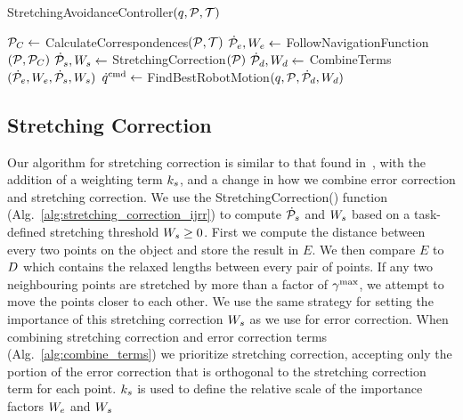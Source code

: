 \begin{algorithm}[h]
    \caption{StretchingAvoidanceController$(q, \mathcal{P}, \mathcal{T})$}
    \begin{algorithmic}[1]
        \State $\mathcal{P}_C \gets$ CalculateCorrespondences$(\mathcal{P}, \mathcal{T})$ \label{alg:calc_corr_line}
        \State $\dot{\mathcal{P}}_e, W_e \gets$ FollowNavigationFunction$(\mathcal{P}, \mathcal{P}_C)$ \label{alg:follow_nav_line}
        \State $\dot{\mathcal{P}}_s, W_s \gets$ StretchingCorrection$(\mathcal{P})$ \label{alg:stretch_corr_line}
        \State $\dot{\mathcal{P}}_d, W_d \gets$ CombineTerms$(\dot{\mathcal{P}}_e, W_e, \dot{\mathcal{P}}_s, W_s)$ \label{alg:combine_line}
        \State $\dot{q}^\textrm{cmd} \gets$ FindBestRobotMotion$(q, \mathcal{P}, \dot{\mathcal{P}}_d, W_d)$ \label{alg:find_best_line}
    \end{algorithmic}
    \label{alg:stretching_avoidance_controller}
\end{algorithm}

\subsection{Stretching Correction}
\label{sec:stretching_correction}

Our algorithm for stretching correction is similar to that found in~\cite{Berenson2013}, with the addition of a weighting term $k_s$, and a change in how we combine error correction and stretching correction. We use the StretchingCorrection() function (Alg.~\ref{alg:stretching_correction_ijrr}) to compute $\dot{\mathcal{P}}_s$ and $W_s$ based on a task-defined stretching threshold $W_s \geq 0$. First we compute the distance between every two points on the object and store the result in $E$. We then compare $E$ to $D$ which contains the relaxed lengths between every pair of points. If any two neighbouring points are stretched by more than a factor of $\gamma^{\textrm{max}}$, we attempt to move the points closer to each other. We use the same strategy for setting the importance of this stretching correction $W_s$ as we use for error correction. When combining stretching correction and error correction terms (Alg.~\ref{alg:combine_terms}) we prioritize stretching correction, accepting only the portion of the error correction that is orthogonal to the stretching correction term for each point. $k_s$ is used to define the relative scale of the importance factors $W_e$ and $W_s$

